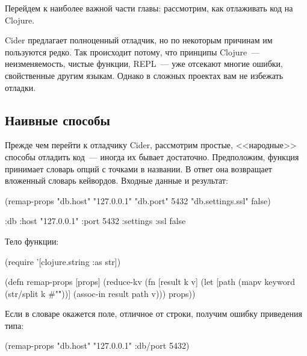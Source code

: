\label{section-debug}


Перейдем к наиболее важной части главы: рассмотрим, как отлаживать код на Clojure.

Cider предлагает полноценный отладчик, но по некоторым причинам им пользуются редко. Так происходит потому, что принципы Clojure~--- неизменяемость, чистые функции, REPL~--- уже отсекают многие ошибки, свойственные другим языкам. Однако в сложных проектах вам не избежать отладки.

\subsection{Наивные способы}

Прежде чем перейти к отладчику Cider, рассмотрим простые, <<народные>> способы отладить код~--- иногда их бывает достаточно. Предположим, функция принимает словарь опций с точками в названии. В ответ она возвращает вложенный словарь кейвордов. Входные данные и результат:

\begin{english}
  \begin{clojure}
(remap-props
  {"db.host" "127.0.0.1"
   "db.port" 5432
   "db.settings.ssl" false})

{:db
 {:host "127.0.0.1"
  :port 5432
  :settings {:ssl false}}}
  \end{clojure}
\end{english}

Тело функции:

\begin{english}
  \begin{clojure}
(require '[clojure.string :as str])

(defn remap-props [props]
  (reduce-kv
   (fn [result k v]
     (let [path
           (mapv keyword (str/split k #"\."))]
       (assoc-in result path v)))
   {}
   props))
  \end{clojure}
\end{english}

Если в словаре окажется поле, отличное от строки, получим ошибку приведения типа:

\iflarge

\begin{english}
  \begin{text}
(remap-props {"db.host"
              "127.0.0.1"
              :db/port 5432})
  \end{text}
\end{english}

